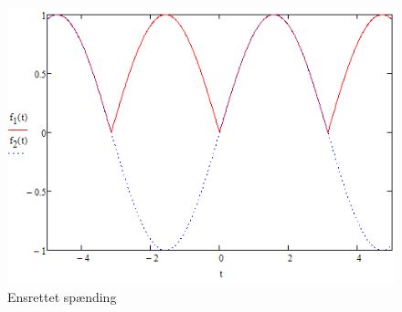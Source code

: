 \begin{figure}[H]
	\centering
	\includegraphics[scale=1]{../Hardware/PSU/Ensretning}
	\caption{Ensrettet spænding}
	\label{photo:Ensrettet}
\end{figure}


